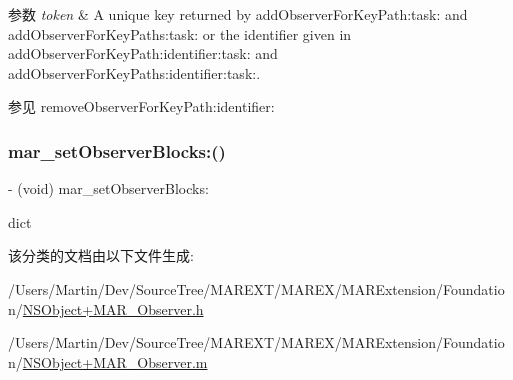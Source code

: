 \begin{DoxyParams}{参数}
{\em token} & A unique key returned by add\+Observer\+For\+Key\+Path\+:task\+: and add\+Observer\+For\+Key\+Paths\+:task\+: or the identifier given in add\+Observer\+For\+Key\+Path\+:identifier\+:task\+: and add\+Observer\+For\+Key\+Paths\+:identifier\+:task\+:. \\
\hline
\end{DoxyParams}
\begin{DoxySeeAlso}{参见}
remove\+Observer\+For\+Key\+Path\+:identifier\+: 
\end{DoxySeeAlso}
\mbox{\label{category_n_s_object_07_m_a_r___observer_08_a16dc347007ed42bb5d1287e0bc3f0094}} 
\subsubsection{\texorpdfstring{mar\+\_\+set\+Observer\+Blocks\+:()}{mar\_setObserverBlocks:()}}
{\footnotesize\ttfamily -\/ (void) mar\+\_\+set\+Observer\+Blocks\+: \begin{DoxyParamCaption}\item[{(N\+S\+Mutable\+Dictionary $\ast$)}]{dict }\end{DoxyParamCaption}\hspace{0.3cm}{\ttfamily [implementation]}}



该分类的文档由以下文件生成\+:\begin{DoxyCompactItemize}
\item 
/\+Users/\+Martin/\+Dev/\+Source\+Tree/\+M\+A\+R\+E\+X\+T/\+M\+A\+R\+E\+X/\+M\+A\+R\+Extension/\+Foundation/\hyperlink{_n_s_object_09_m_a_r___observer_8h}{N\+S\+Object+\+M\+A\+R\+\_\+\+Observer.\+h}\item 
/\+Users/\+Martin/\+Dev/\+Source\+Tree/\+M\+A\+R\+E\+X\+T/\+M\+A\+R\+E\+X/\+M\+A\+R\+Extension/\+Foundation/\hyperlink{_n_s_object_09_m_a_r___observer_8m}{N\+S\+Object+\+M\+A\+R\+\_\+\+Observer.\+m}\end{DoxyCompactItemize}
